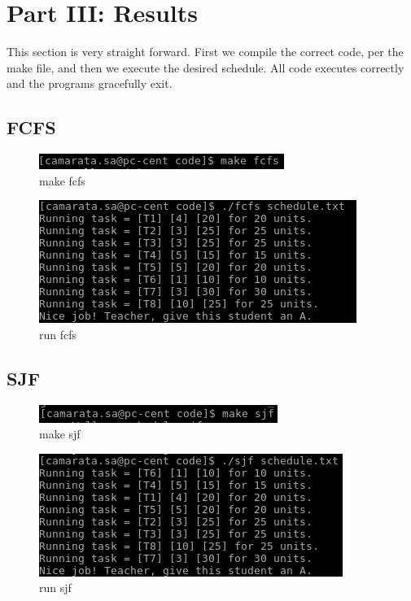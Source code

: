 \documentclass[10pt]{article}
\begin{document}
\section{Part III: Results}
This section is very straight forward.  First we compile the correct code, per the make file, and then we execute the desired schedule.  All code executes correctly and the programs gracefully exit.

\subsection{FCFS}

\begin{figure}[H]
\centering
\includegraphics[scale=0.5]{./images/make_fcfs.png}
\caption{make fcfs}
\label{fig:Code}
\end{figure}

\begin{figure}[H]
\centering
\includegraphics[scale=0.5]{./images/run_fcfs.png}
\caption{run fcfs}
\label{fig:Code}
\end{figure}

\subsection{SJF}

\begin{figure}[H]
\centering
\includegraphics[scale=0.5]{./images/make_sjf.png}
\caption{make sjf}
\label{fig:Code}
\end{figure}

\begin{figure}[H]
\centering
\includegraphics[scale=0.5]{./images/run_sjf.png}
\caption{run sjf}
\label{fig:Code}
\end{figure}
\end{document}

